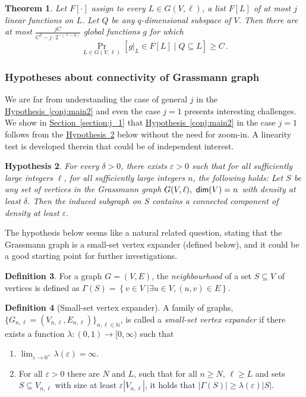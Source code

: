 \documentclass[11pt]{article}
\numberwithin{equation}{section}
\newtheorem{theorem}{Theorem}[section]
\theoremstyle{definition}
\newtheorem{definition}[theorem]{Definition}
\theoremstyle{plain}
\newcommand{\expref}[2]{\hyperref[#2]{#1~\ref{#2}}}
\newtheorem{conj}[theorem]{Hypothesis}
\newcommand\sett[2]{\left\{ \left. #1 \;\right\vert #2 \right\}}
\newcommand\Prob[2]{{\Pr_{#1}\left[ {#2} \right]}}
\newcommand\eps{\varepsilon}
\renewcommand\geq{\geqslant}
\begin{document}
\begin{theorem}\label{thm:list_dec_upper} Let $F[\cdot]$ assign to every $L \in G(V,\ell)$, a list $F[L]$ of
at most $j$ linear functions on $L$.  Let $Q$ be any $q$-dimensional subspace of $V$.
Then there are at most $\frac{jC}{C^2-j\cdot 2^{-(\ell-q)}}$ global functions $g$ for which
\[
\Prob{L\in G(V,\ell)}{g|_L\in F[L] \mid Q \subseteq L}\geqslant C\,.%
\]
\end{theorem}





%
\subsubsection{Hypotheses about connectivity of Grassmann graph}

We are far from understanding the case of general $j$ in the
\expref{Hypothesis}{conj:main2} and even the case $j=1$
presents interesting challenges. We show in \expref{Section}{section:j_1} that
\expref{Hypothesis}{conj:main2} in the case $j=1$ follows from the
\expref{Hypothesis}{conj:gras_expand} below without the need for zoom-in.
A linearity test is developed therein that could be of independent interest.

\begin{conj}\label{conj:gras_expand}
For every %
$\delta >0$,  there exists %
%
$\eps > 0$
  such that
  for all sufficiently large integers $\ell$, for all sufficiently large integers $n$,
 the following holds:
 Let $S$ be any set
of vertices in the Grassmann graph $G(V,\ell), ~{\sf dim}(V)=n$ with density at least $\delta$. Then the
induced subgraph on $S$ contains a connected component of density at least $\eps$.
\end{conj}

%
%
%
%
The hypothesis below  seems
like a natural related question, stating that the Grassmann graph is a
small-set vertex expander (defined below), and it could be a good starting point
for further investigations.
%
\begin{definition}
For a graph $G = (V,E)$, the \emph{neighbourhood} of a set %
%
$S\subseteq V$   %
of vertices  %
is defined as
  $\Gamma(S) = \sett{v\in V}{\exists u\in V, (u,v)\in E}$.
\end{definition}
\begin{definition}[Small-set vertex expander] %
\label{def:small-set}  %
A family of graphs, $\{G_{n,\ell} = (V_{n,\ell},E_{n,\ell})\}_{n,\ell\in\mathbb{N}}$,
%
%
is called a \emph{small-set vertex expander} if there %
exists a function $\lambda\colon (0,1)\to [0,\infty)$ such that
\begin{enumerate}
  \item $\lim_{\eps\rightarrow 0^{+}}\lambda(\eps)=\infty$.
  \item For all $\eps>0$ there are $N$ and $L$, such that for all $n\geq N$, $\ell\geq L$
and sets $S\subseteq V_{n,\ell}$ with size at least $\eps|V_{n,\ell}|$,
  it holds that $|\Gamma(S)|\geq \lambda(\eps)|S|$.
\end{enumerate}
\end{definition}
\end{document}
